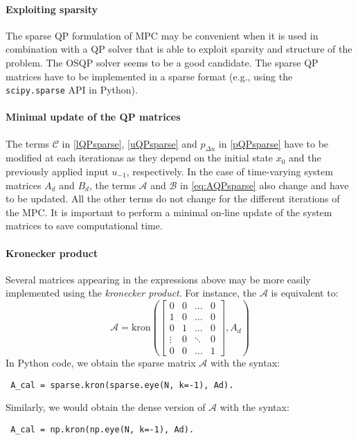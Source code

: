 \documentclass[a4paper,12pt,fleqn]{article}
\newcommand{\kron}{\text{kron}}
\begin{document}
\paragraph{Exploiting sparsity}
The sparse QP formulation of MPC may be convenient when it is used in combination with a QP solver that is able to 
exploit sparsity and structure of the problem. The OSQP solver seems to be a good candidate. 
The sparse QP matrices have to be implemented in a sparse format (e.g., using the
\texttt{scipy.sparse} API in Python).
\paragraph{Minimal update of the QP matrices}
The terms $\mathcal{C}$ in \eqref{lQPsparse}, \eqref{uQPsparse} and $p_{\Delta u}$ in \eqref{pQPsparse} have to be modified at each iterationas as they depend on the initial state $x_0$ and the previously
applied input $u_{-1}$, respectively. In the case of time-varying system matrices $A_d$ and $B_d$, the terms $\mathcal{A}$ and 
$\mathcal{B}$ in \eqref{eq:AQPsparse} also change and have to be updated. All the other terms do not change for the different iterations
of the MPC. It is important to perform a minimal on-line update of the system matrices to save computational time.
\paragraph{Kronecker product}
Several matrices appearing in the expressions above may be more easily implemented using the \emph{kronecker product}.
For instance, the $\mathcal{A}$ is equivalent to:
\begin{equation}
\mathcal{A} = \kron \left (
 \begin{bmatrix}
 0      &0      &\dots  &0\\
 1      &0      &\dots  & 0\\
 0      &1     &\dots  &0\\
 \vdots &0      &\ddots & 0\\
 0      &0      &\dots  &1
\end{bmatrix}, A_d \right)
\end{equation}
In Python code, we obtain the sparse matrix $\mathcal{A}$ with the syntax:
\begin{verbatim}
 A_cal = sparse.kron(sparse.eye(N, k=-1), Ad).
\end{verbatim}
Similarly, we would obtain the dense version of $\mathcal{A}$ with the syntax:
\begin{verbatim}
 A_cal = np.kron(np.eye(N, k=-1), Ad).
\end{verbatim}
\end{document}
